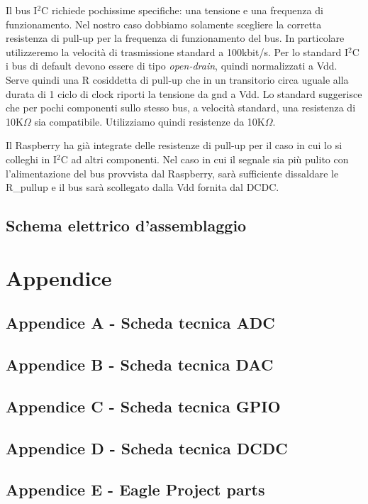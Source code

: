 \documentclass[10pt]{article}
\begin{document}
		Il bus I\(^2\)C richiede pochissime specifiche: una tensione e una frequenza di funzionamento.
		Nel nostro caso dobbiamo solamente scegliere la corretta resistenza di pull-up per la frequenza di funzionamento del bus.
		In particolare utilizzeremo la velocità di trasmissione standard a 100kbit/s.
		Per lo standard I\(^2\)C i bus di default devono essere di tipo \emph{open-drain}, quindi normalizzati a Vdd. Serve quindi una R cosiddetta di pull-up che in un transitorio circa uguale alla durata di 1 ciclo di clock riporti la tensione da gnd a Vdd.
		Lo standard suggerisce che per pochi componenti sullo stesso bus, a velocità standard, una resistenza di 10K\(\Omega\) sia compatibile.
		Utilizziamo quindi resistenze da 10K\(\Omega\).

		Il Raspberry ha già integrate delle resistenze di pull-up per il caso in cui lo si colleghi in I\(^2\)C ad altri componenti.
		Nel caso in cui il segnale sia più pulito con l'alimentazione del bus provvista dal Raspberry, sarà sufficiente dissaldare le R\_pullup e il bus sarà scollegato dalla Vdd fornita dal DCDC.

\newpage
{}
	\subsection{Schema elettrico d'assemblaggio}
	\begin{figure}[h!]
		
	\end{figure}
\restoregeometry

\section{Appendice}
\subsection{Appendice A - Scheda tecnica ADC}
		

\newpage
\subsection{Appendice B - Scheda tecnica DAC}
		

\newpage
\subsection{Appendice C - Scheda tecnica GPIO}
	

\newpage
\subsection{Appendice D - Scheda tecnica DCDC}
	

\newpage
\subsection{Appendice E - Eagle Project parts}
	
\end{document}
